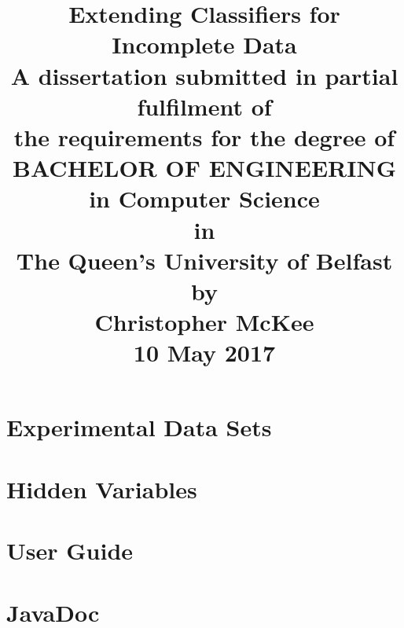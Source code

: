 \documentclass[12pt,a4paper]{report}
\begin{document}
\title{Extending Classifiers for Incomplete Data\\
\large
A dissertation submitted in partial fulfilment of\\
the requirements for the degree of\\
BACHELOR OF ENGINEERING in Computer Science\\
in\\
The Queen's University of Belfast\\
by\\
Christopher McKee\\
10 May 2017
}
\author{}
\date{}
\maketitle
\newpage



\tableofcontents
\listoftables
\listoffigures







\appendix
\chapter{Experimental Data Sets}
\label{datasets}

\chapter{Hidden Variables}
\label{hidden}

\chapter{User Guide}
\label{uguide}

\chapter{JavaDoc}
\label{JavaDoc}

\end{document}
